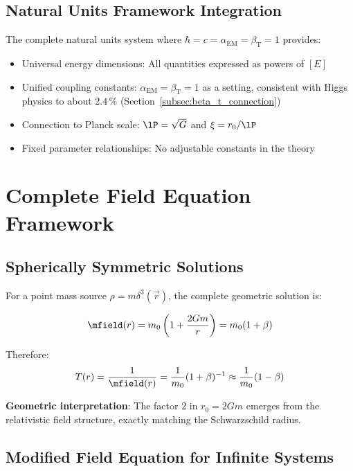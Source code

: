 	\subsection{Natural Units Framework Integration}
	\label{subsec:natural_units_integration}
	
	The complete natural units system where $\hbar = c = \alpha_{\text{EM}} = \beta_{\text{T}} = 1$ provides:
	\begin{itemize}
		\item Universal energy dimensions: All quantities expressed as powers of $[E]$
		\item Unified coupling constants: $\alpha_{\text{EM}} = \beta_{\text{T}} = 1$ as a setting, consistent with Higgs physics to about $2.4\,\%$ (Section~\ref{subsec:beta_t_connection})
		\item Connection to Planck scale: $\lP = \sqrt{G}$ and $\xi = r_0/\lP$
		\item Fixed parameter relationships: No adjustable constants in the theory
	\end{itemize}
	
	\section{Complete Field Equation Framework}
	\label{sec:field_equation_framework}
	
	\subsection{Spherically Symmetric Solutions}
	\label{subsec:spherical_solutions}
	
	For a point mass source $\rho = m \delta^3(\vec{r})$, the complete geometric solution is:
	
	\begin{equation}
		\mfield(r) = m_0\left(1 + \frac{2Gm}{r}\right) = m_0(1 + \beta)
		\label{eq:mass_field_solution}
	\end{equation}
	
	Therefore:
	\begin{equation}
		T(r) = \frac{1}{\mfield(r)} = \frac{1}{m_0}(1 + \beta)^{-1} \approx \frac{1}{m_0}(1 - \beta)
		\label{eq:time_field_solution}
	\end{equation}
	
	\textbf{Geometric interpretation}: The factor 2 in $r_0 = 2Gm$ emerges from the relativistic field structure, exactly matching the Schwarzschild radius.
	
	\subsection{Modified Field Equation for Infinite Systems}
	\label{subsec:infinite_systems}
	
